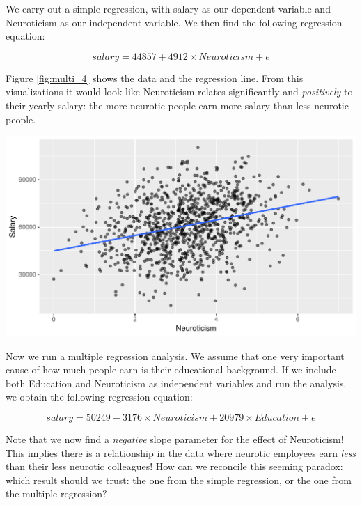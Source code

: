 \documentclass[]{book}\usepackage[]{graphicx}\usepackage[]{color}
\makeatletter
\def\maxwidth{ %
  \ifdim\Gin@nat@width>\linewidth
    \linewidth
  \else
    \Gin@nat@width
  \fi
}
\newenvironment{knitrout}{}{} %
\makeatother
\begin{document}
We carry out a simple regression, with salary as our dependent variable and Neuroticism as our independent variable. We then find the following regression equation:







\begin{equation}
salary = 44857 + 4912 \times Neuroticism + e
\end{equation}


Figure \ref{fig:multi_4} shows the data and the regression line. From this visualizations it would look like Neuroticism relates significantly and \textit{positively} to their yearly salary: the more neurotic people earn more salary than less neurotic people.



\begin{knitrout}
\color{fgcolor}

{\centering \includegraphics[width=\maxwidth]{figure/multi_4-1} 

}



\end{knitrout}

Now we run a multiple regression analysis. We assume that one very important cause of how much people earn is their educational background. If we include both Education and Neuroticism as independent variables and run the analysis, we obtain the following regression equation:

\begin{equation}
salary = 50249  -3176 \times Neuroticism + 20979 \times Education + e
\end{equation}

Note that we now find a \textit{negative} slope parameter for the effect of Neuroticism! This implies there is a relationship in the data where neurotic employees earn \textit{less} than their less neurotic colleagues! How can we reconcile this seeming paradox: which result should we trust: the one from the simple regression, or the one from the multiple regression?
\end{document}
